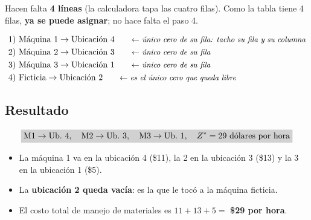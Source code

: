 \documentclass[11pt,a4paper]{article}
\let\pasobase\paso
\renewcommand{\paso}[1]{\needspace{7\baselineskip}\pasobase{#1}}
\newcommand{\rejilla}[3]{%
  \foreach \i in {2,...,#2}{\foreach \j in {2,...,#3}{%
    \draw[gray!55, thin] (#1-\i-\j.north west) rectangle (#1-\i-\j.south east);}}%
  \draw[thick] (#1-2-2.north west) rectangle (#1-#2-#3.south east);}
\newcommand{\sfila}[3]{\begin{pgfonlayer}{background}\fill[gray!16] (#1-#2-2.north west) rectangle (#1-#2-#3.south east);\end{pgfonlayer}}
\newcommand{\lfila}[3]{\begin{pgfonlayer}{background}\draw[tapa] ($(#1-#2-2.west)+(-1.5pt,0)$) -- ($(#1-#2-#3.east)+(1.5pt,0)$);\end{pgfonlayer}}
\newcommand{\cero}[2]{\node[asignado] at (#1-#2) {};}
\newcommand{\pie}[4]{\node[font=\footnotesize, below=1mm, align=center] at ($(#1-#2-2.south west)!0.5!(#1-#2-#3.south east)$) {#4};}
\begin{document}
Hacen falta \textbf{4 líneas} (la calculadora tapa las cuatro filas). Como la tabla tiene 4 filas,
\textbf{ya se puede asignar}; no hace falta el paso 4.

\begin{center}
\qquad
{}
\end{center}

\begin{align*}
&1)\ \text{Máquina 1} \to \text{Ubicación 4} \nota{único cero de su fila: tacho su fila y su columna}\\
&2)\ \text{Máquina 2} \to \text{Ubicación 3} \nota{único cero de su fila}\\
&3)\ \text{Máquina 3} \to \text{Ubicación 1} \nota{único cero de su fila}\\
&4)\ \text{Ficticia} \to \text{Ubicación 2} \nota{es el único cero que queda libre}
\end{align*}

\subsection*{Resultado}
\[
\res{\text{M1} \to \text{Ub.~4},\quad \text{M2} \to \text{Ub.~3},\quad \text{M3} \to \text{Ub.~1},\quad Z^* = 29 \text{ dólares por hora}}
\]
\begin{itemize}[itemsep=2pt]
  \item La máquina 1 va en la ubicación 4 (\$11), la 2 en la ubicación 3 (\$13) y la 3 en la ubicación 1 (\$5).
  \item La \textbf{ubicación 2 queda vacía}: es la que le tocó a la máquina ficticia.
  \item El costo total de manejo de materiales es $11 + 13 + 5 = $ \textbf{\$29 por hora}.
\end{itemize}
\end{document}
